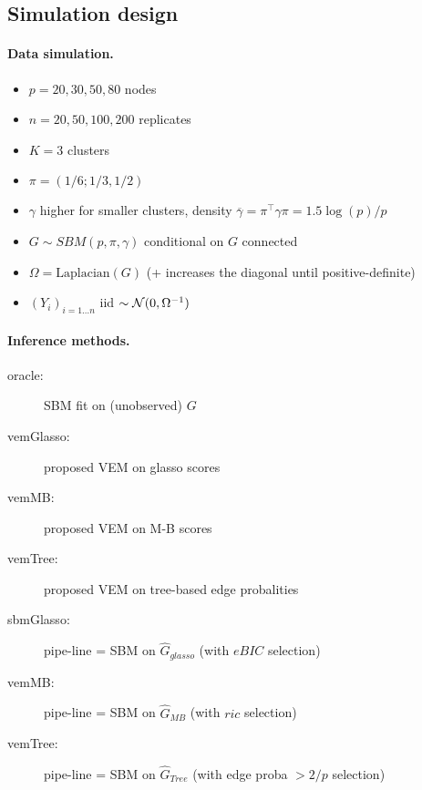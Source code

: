 \subsection{Simulation design}

\paragraph{Data simulation.}
\begin{itemize}
 \item $p = 20, 30, 50, 80$ nodes
 \item $n = 20, 50, 100, 200$ replicates
 \item $K =3$ clusters
 \item $\pi = (1/6; 1/3, 1/2)$
 \item $\gamma$ higher for smaller clusters, density $\overline{\gamma} = \pi^\intercal \gamma \pi = 1.5 \log(p)/p$
 \item $G \sim SBM(p, \pi, \gamma)$ conditional on $G$ connected
 \item $\Omega = \text{Laplacian}(G)$ (+ increases the diagonal until positive-definite)
 \item $(Y_i)_{i = 1 \dots n}$ iid $\sim \mathcal{N}(0, \Omega^{-1})$
\end{itemize}

\paragraph{Inference methods.}
\begin{description}
 \item[oracle:] SBM fit on (unobserved) $G$
 \item[vemGlasso:] proposed VEM on glasso scores
 \item[vemMB:] proposed VEM on M-B scores
 \item[vemTree:] proposed VEM on tree-based edge probalities
 \item[sbmGlasso:] pipe-line = SBM on $\widehat{G}_{glasso}$ (with $eBIC$ selection)
 \item[vemMB:] pipe-line = SBM on $\widehat{G}_{MB}$ (with $ric$ selection)
 \item[vemTree:] pipe-line = SBM on $\widehat{G}_{Tree}$ (with edge proba $> 2 /p$ selection)
\end{description}

